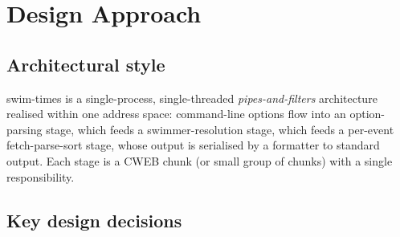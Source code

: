 \documentclass[12pt]{article}
\begin{document}
\section{Design Approach}

\subsection{Architectural style}

swim-times is a single-process, single-threaded
\emph{pipes-and-filters} architecture realised within one address
space: command-line options flow into an option-parsing stage,
which feeds a swimmer-resolution stage, which feeds a per-event
fetch-parse-sort stage, whose output is serialised by a
formatter to standard output.  Each stage is a CWEB chunk
(or small group of chunks) with a single responsibility.

\subsection{Key design decisions}
\end{document}
